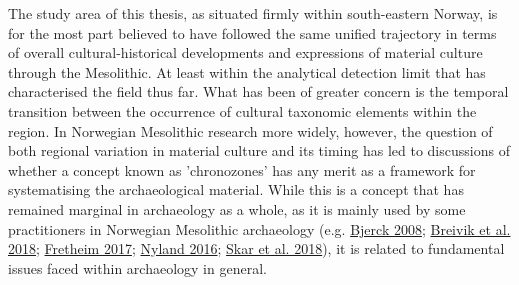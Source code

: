 \documentclass[
  a4paper,
  oneside]{uiophdthesis}
\begin{document}
The study area of this thesis, as situated firmly within south-eastern Norway, is for the most part believed to have followed the same unified trajectory in terms of overall cultural-historical developments and expressions of material culture through the Mesolithic. At least within the analytical detection limit that has characterised the field thus far. What has been of greater concern is the temporal transition between the occurrence of cultural taxonomic elements within the region. In Norwegian Mesolithic research more widely, however, the question of both regional variation in material culture and its timing has led to discussions of whether a concept known as 'chronozones' has any merit as a framework for systematising the archaeological material. While this is a concept that has remained marginal in archaeology as a whole, as it is mainly used by some practitioners in Norwegian Mesolithic archaeology (e.g. \protect\hyperlink{ref-bjerck2008}{Bjerck 2008}; \protect\hyperlink{ref-breivik2018}{Breivik et al. 2018}; \protect\hyperlink{ref-fretheim2017}{Fretheim 2017}; \protect\hyperlink{ref-nyland2016}{Nyland 2016}; \protect\hyperlink{ref-skar2018}{Skar et al. 2018}), it is related to fundamental issues faced within archaeology in general.
\end{document}
